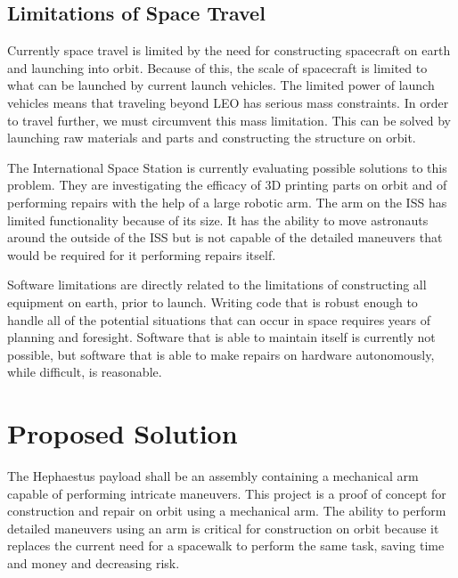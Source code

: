 \documentclass[letterpaper,10pt]{article}
\begin{document}
\subsection{Limitations of Space Travel}
Currently space travel is limited by the need for constructing spacecraft on earth and launching into
orbit. Because of this, the scale of spacecraft is limited to what can be launched by current launch
 vehicles. The limited power of launch vehicles means that traveling beyond LEO has serious mass 
constraints. In order to travel further, we must circumvent this mass limitation. This can be 
solved by launching raw materials and parts and constructing the structure on orbit. 

The International Space Station is currently evaluating possible solutions to this problem. They are 
investigating the efficacy of 3D printing parts on orbit and of performing repairs with the help of 
a large robotic arm. The arm on the ISS has limited functionality because of its size.
 It has the ability to move astronauts around the outside of the ISS but is not capable of the detailed
maneuvers that would be required for it performing repairs itself.

Software limitations are directly related to the limitations of constructing all equipment on earth, prior to launch. Writing code that is robust enough to handle all of the potential situations that can occur in space requires years of planning and foresight. Software that is able to maintain itself is currently not possible, but software that is able to make repairs on hardware autonomously, while difficult, is reasonable.

\section{Proposed Solution}
The Hephaestus payload shall be an assembly containing a mechanical arm capable of performing
intricate maneuvers.
This project is a proof of concept for construction and repair on orbit using a mechanical arm. 
The ability to perform detailed maneuvers using an arm is critical for construction on orbit because
it replaces the current need for a spacewalk to perform the same task, saving time and money and
decreasing risk.
\end{document}
